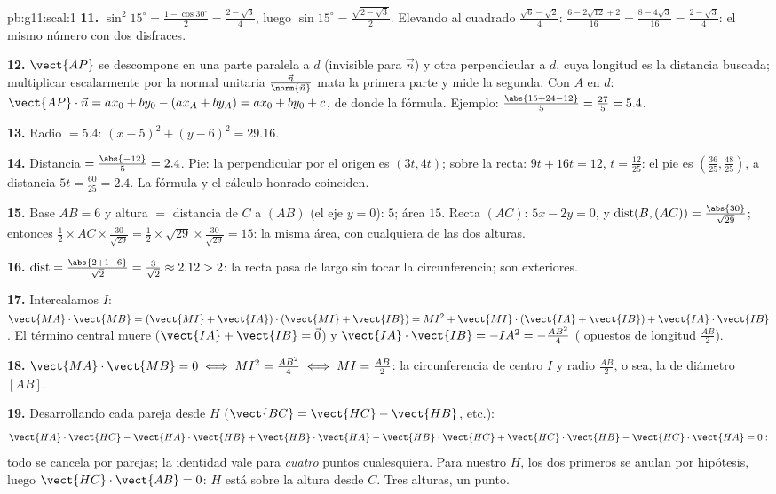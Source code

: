 \begin{solution}{pb:g11:scal:1}
\textbf{11.} $\sin^2 15^\circ = \frac{1 - \cos 30^\circ}{2}
= \frac{2 - \sqrt3}{4}$, luego
$\sin 15^\circ = \frac{\sqrt{2 - \sqrt3}}{2}$. Elevando al cuadrado
$\frac{\sqrt6 - \sqrt2}{4}$:
$\frac{6 - 2\sqrt{12} + 2}{16} = \frac{8 - 4\sqrt3}{16} =
\frac{2 - \sqrt3}{4}$: el mismo número con dos disfraces.

\textbf{12.} $\vect{AP}$ se descompone en una parte paralela a $d$
(invisible para $\vec n$) y otra perpendicular a $d$, cuya longitud es la
distancia buscada; multiplicar escalarmente por la normal unitaria
$\frac{\vec n}{\norm{\vec n}}$ mata la primera parte y mide la segunda.
Con $A$ en $d$: $\vect{AP} \cdot \vec n = a x_0 + b y_0 -
(a x_A + b y_A) = a x_0 + b y_0 + c$, de donde la fórmula. Ejemplo:
$\frac{\abs{15 + 24 - 12}}{5} = \frac{27}{5} = 5.4$.

\textbf{13.} Radio $= 5.4$: $(x - 5)^2 + (y - 6)^2 = 29.16$.

\textbf{14.} Distancia $= \frac{\abs{-12}}{5} = 2.4$. Pie: la
perpendicular por el origen es $(3t, 4t)$; sobre la recta:
$9t + 16t = 12$, $t = \frac{12}{25}$: el pie es
$\left(\frac{36}{25}, \frac{48}{25}\right)$, a distancia
$5t = \frac{60}{25} = 2.4$. La fórmula y el cálculo honrado coinciden.

\textbf{15.} Base $AB = 6$ y altura $=$ distancia de $C$ a $(AB)$ (el eje
$y = 0$): $5$; área $15$. Recta $(AC)$: $5x - 2y = 0$, y
$\operatorname{dist}(B, (AC)) = \frac{\abs{30}}{\sqrt{29}}$; entonces
$\frac12 \times AC \times \frac{30}{\sqrt{29}} =
\frac12 \times \sqrt{29} \times \frac{30}{\sqrt{29}} = 15$: la misma área,
con cualquiera de las dos alturas.

\textbf{16.} $\operatorname{dist} = \frac{\abs{2 + 1 - 6}}{\sqrt2} =
\frac{3}{\sqrt2} \approx 2.12 > 2$: la recta pasa de largo sin tocar la
circunferencia; son exteriores.

\textbf{17.} Intercalamos $I$:
$\vect{MA} \cdot \vect{MB} = (\vect{MI} + \vect{IA}) \cdot
(\vect{MI} + \vect{IB}) = MI^2 + \vect{MI} \cdot (\vect{IA} +
\vect{IB}) + \vect{IA} \cdot \vect{IB}$. El término central muere
($\vect{IA} + \vect{IB} = \vec 0$) y
$\vect{IA} \cdot \vect{IB} = -IA^2 = -\frac{AB^2}{4}$ ( opuestos
de longitud $\frac{AB}2$).

\textbf{18.} $\vect{MA} \cdot \vect{MB} = 0 \iff MI^2 = \frac{AB^2}{4}
\iff MI = \frac{AB}{2}$: la circunferencia de centro $I$ y radio
$\frac{AB}2$, o sea, la de diámetro $[AB]$.

\textbf{19.} Desarrollando cada pareja desde $H$ ($\vect{BC} =
\vect{HC} - \vect{HB}$, etc.):
\[
\vect{HA} \cdot \vect{HC} - \vect{HA} \cdot \vect{HB}
+ \vect{HB} \cdot \vect{HA} - \vect{HB} \cdot \vect{HC}
+ \vect{HC} \cdot \vect{HB} - \vect{HC} \cdot \vect{HA} = 0 :
\]
todo se cancela por parejas; la identidad vale para \emph{cuatro} puntos
cualesquiera. Para nuestro $H$, los dos primeros  se
anulan por hipótesis, luego $\vect{HC} \cdot \vect{AB} = 0$: $H$ está
sobre la altura desde $C$. Tres alturas, un punto.


\end{solution}
